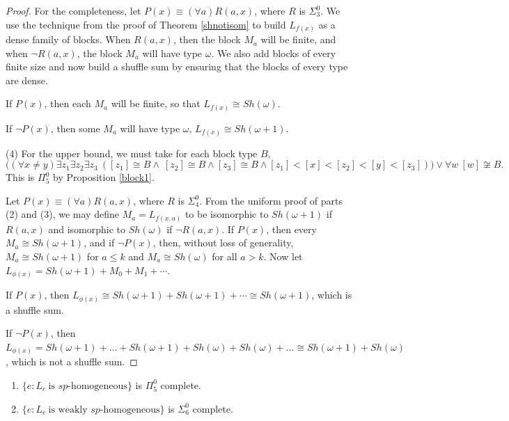 \documentclass[11pt]{amsart}
\theoremstyle{definition}
\begin{document}
\begin{proof}
For the completeness, let $P(x) \equiv (\forall a)R(a,x)$, where $R$ is $\Sigma^0_3$. We use the technique from the proof of Theorem \ref{shnotisom} to build $L_{f(x)}$ as a dense family of blocks. When $R(a,x)$, then the block $M_a$ will be finite, and when $\neg R(a,x)$, the block $M_a$ will have type $\omega$. We also add blocks of every finite size and now build a shuffle sum by ensuring that the blocks of every type are dense. 

If $P(x)$, then each $M_a$ will be finite, so that $L_{f(x)} \cong Sh(\omega)$.

If $\neg P(x)$, then some $M_a$ will have type $\omega$, $L_{f(x)} \cong Sh(\omega+1)$. 

\medskip

(4) For the upper bound, we must take for each block type $B$,
\[\Big((\forall x\neq y)\exists z_1 \exists z_2 \exists z_3 ~(  [z_1]\cong B \land ~ [z_2]\cong B \land  [z_3]\cong B \land [z_1]<[x]<[z_2]<[y]<[z_3])\Big)\lor \forall w ~ [w]\not\cong B.\]
This is $\Pi_5^0$ by Proposition \ref{block1}.

Let $P(x) \equiv (\forall a) R(a,x)$, where $R$ is $\Sigma^0_4$. 
From the uniform proof of parts (2) and (3), we may define $M_a = L_{f(x,a)}$ to be isomorphic to $Sh(\omega+1)$ if $R(a,x)$ and isomorphic to $Sh(\omega)$ if $\neg R(a,x)$.  If $P(x)$, then every $M_a \cong Sh(\omega+1)$, and if $\neg P(x)$, then, without loss of generality, $M_a \cong Sh(\omega+1)$ for $a \leq k$ and $M_a \cong Sh(\omega)$ for all $a > k$.  Now let $L_{\phi(x)} = Sh(\omega+1) + M_0 + M_1 + \cdots$. 

If $P(x)$, then $L_{\phi(x)}  \cong Sh(\omega+1) + 
Sh(\omega+1) + \cdots \cong Sh(\omega+1)$, which is a shuffle sum. 

If $\neg P(x)$, then  $L_{\phi(x)} = Sh(\omega+1) + \dots +  Sh(\omega+1) + Sh(\omega) + Sh(\omega) + \dots \cong Sh(\omega+1) + Sh(\omega)$, which is not a shuffle sum. 
\end{proof}

\begin{theorem} \label{homcplx} \begin{enumerate}
    \item $\{e: L_e \ \text{is $sp$-homogeneous}\}$ is $\Pi^0_5$ complete.
    \item $\{e: L_e \ \text{is weakly $sp$-homogeneous}\}$ is $\Sigma^0_6$ complete.  
\end{enumerate}
\end{theorem}
\end{document}
